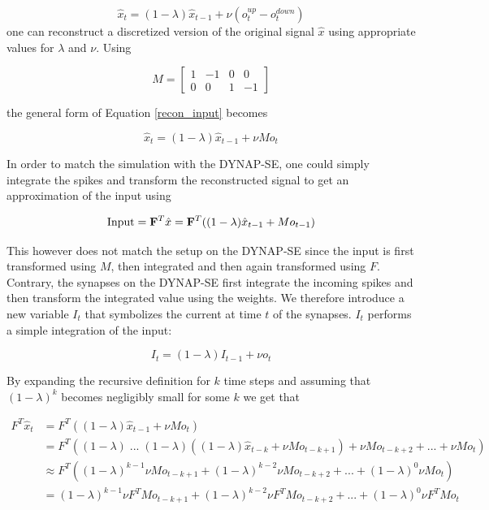\documentclass[twoside,11pt]{article}
\begin{document}
\begin{equation} \label{recon_input}
  \hat{x}_t = (1-\lambda)\hat{x}_{t-1} + \nu(o^{up}_t - o^{down}_t)
\end{equation}
one can reconstruct a discretized version of the original signal $\hat{x}$ using appropriate values
for $\lambda$ and $\nu$. Using

\[M = \begin{bmatrix}
  1 & -1 & 0 & 0 \\ 
  0 & 0 & 1 & -1
  \end{bmatrix}
\]

the general form of Equation \ref{recon_input} becomes

\begin{equation*}
  \hat{x}_t = (1-\lambda)\hat{x}_{t-1} + \nu Mo_t
\end{equation*}

In order to match the simulation with the DYNAP-SE, one could simply integrate the spikes and transform
the reconstructed signal to get an approximation of the input using

\begin{equation*}
  \textnormal{Input} = \mathbf{F}^T \hat{x} = \mathbf{F}^T((1-\lambda)\hat{x}_{t-1} + Mo_{t-1})
\end{equation*}

This however does not match the setup on the DYNAP-SE since the input is first transformed using $M$, then
integrated and then again transformed using $F$. Contrary, the synapses on the DYNAP-SE first integrate the
incoming spikes and then transform the integrated value using the weights. We therefore introduce a new variable
$I_t$ that symbolizes the current at time $t$ of the synapses. $I_t$ performs a simple integration of the input:

\begin{equation*}
  I_t = (1-\lambda)I_{t-1} + \nu o_t
\end{equation*}

By expanding the recursive definition for $k$ time steps and assuming that $(1-\lambda)^k$ becomes
negligibly small for some $k$ we get that

\begin{equation*}
  \begin{split}
      F^T \hat{x}_t & = F^T((1-\lambda) \hat{x}_{t-1} + \nu Mo_t) \\
      & = F^T((1-\lambda) \;... \;(1-\lambda)( (1-\lambda) \hat{x}_{t-k} + \nu Mo_{t-k+1}) + \nu Mo_{t-k+2} + ... + \nu Mo_t) \\
      & \approx F^T((1-\lambda)^{k-1} \nu Mo_{t-k+1} + (1-\lambda)^{k-2} \nu Mo_{t-k+2} + ... + (1-\lambda)^{0} \nu Mo_{t}) \\
      & = (1-\lambda)^{k-1} \nu F^TMo_{t-k+1} + (1-\lambda)^{k-2} \nu F^TMo_{t-k+2} + ... + (1-\lambda)^0 \nu F^TMo_t
  \end{split}
  \end{equation*}
\end{document}
